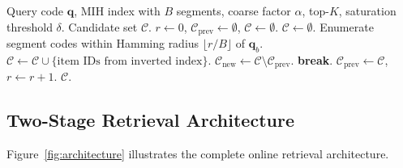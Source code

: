 \documentclass[11pt,a4paper]{article}
\begin{document}
\begin{algorithm}[htbp]
\caption{Adaptive MIH search.}
\label{alg:mih}
\begin{algorithmic}[1]
\Require Query code $\mathbf{q}$, MIH index with $B$ segments, coarse factor $\alpha$, top-$K$, saturation threshold $\delta$.
\Ensure Candidate set $\mathcal{C}$.
\State $r \leftarrow 0$, $\mathcal{C}_{\text{prev}} \leftarrow \emptyset$, $\mathcal{C} \leftarrow \emptyset$.
\Loop
    \State $\mathcal{C} \leftarrow \emptyset$.
        \State Enumerate segment codes within Hamming radius $\lfloor r/B \rfloor$ of $\mathbf{q}_b$.
        \State $\mathcal{C} \leftarrow \mathcal{C} \cup \{\text{item IDs from inverted index}\}$.
    \EndFor
    \State $\mathcal{C}_{\text{new}} \leftarrow \mathcal{C} \setminus \mathcal{C}_{\text{prev}}$.
        \State \textbf{break}.
    \EndIf
    \State $\mathcal{C}_{\text{prev}} \leftarrow \mathcal{C}$, $r \leftarrow r + 1$.
\EndLoop
\State \Return $\mathcal{C}$.
\end{algorithmic}
\end{algorithm}

\subsection{Two-Stage Retrieval Architecture}

Figure~\ref{fig:architecture} illustrates the complete online retrieval architecture.
\end{document}
